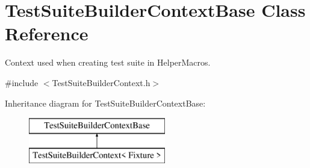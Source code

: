 \hypertarget{class_test_suite_builder_context_base}{\section{Test\-Suite\-Builder\-Context\-Base Class Reference}
\label{class_test_suite_builder_context_base}
}


Context used when creating test suite in Helper\-Macros.  




{\ttfamily \#include $<$Test\-Suite\-Builder\-Context.\-h$>$}

Inheritance diagram for Test\-Suite\-Builder\-Context\-Base\-:\begin{figure}[H]
\begin{center}
\leavevmode
\includegraphics[height=2.000000cm]{class_test_suite_builder_context_base}
\end{center}
\end{figure}
